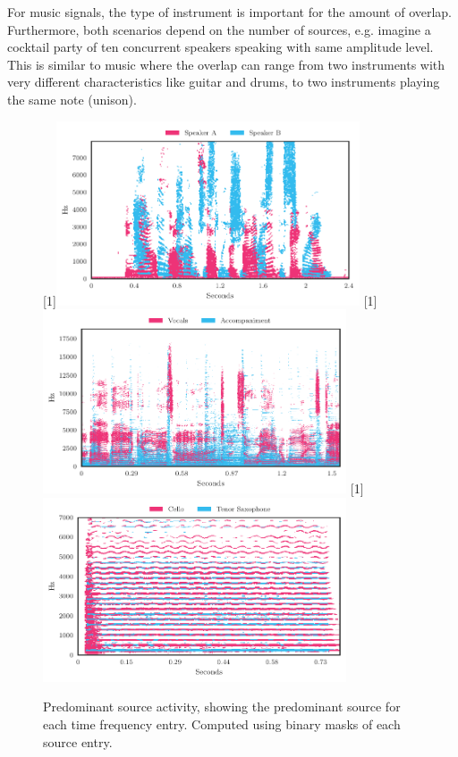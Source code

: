 For music signals, the type of instrument is important for the amount of overlap.
Furthermore, both scenarios depend on the number of sources, e.g. imagine a cocktail party of ten concurrent speakers speaking with same amplitude level.
This is similar to music where the overlap can range from two instruments with very different characteristics like guitar and drums, to two instruments playing the same note (unison).\\

\begin{figure}[h]
\centering
{}%
[1\textwidth]{\includegraphics[width=0.8\textwidth]{gfx/dominance_map_speakers.pdf}}%
\hspace{0.2\textwidth} %
[1\textwidth]{\includegraphics[width=0.8\textwidth]{gfx/dominance_map_vocacc.pdf}}%
\hspace{0.2\textwidth} %
[1\textwidth]{\includegraphics[width=0.8\textwidth]{gfx/dominance_map_unison.pdf}}%
\caption{Predominant source activity, showing the predominant source for each time frequency entry. Computed using binary masks of each source entry.}
\label{fig:dominance}
\end{figure}

